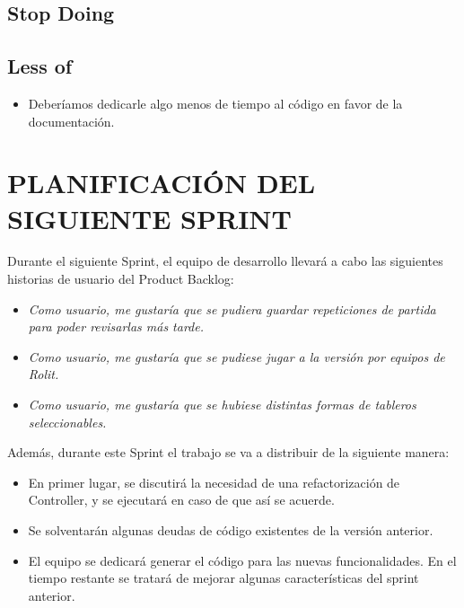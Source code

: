 \documentclass{article}
\begin{document}
\subsection{Stop Doing}


\subsection{Less of}
\begin{itemize}
\item Deberíamos dedicarle algo menos de tiempo al código en favor de la documentación.
\end{itemize}

\section{PLANIFICACIÓN DEL SIGUIENTE SPRINT}
Durante el siguiente Sprint, el equipo de desarrollo llevará a cabo las siguientes historias de usuario del Product Backlog:
\begin{itemize}
\item \textit{Como usuario, me gustaría que se pudiera guardar repeticiones de partida para poder revisarlas más tarde.}
\item \textit{Como usuario, me gustaría que se pudiese jugar a la versión por equipos de Rolit.}
\item \textit{Como usuario, me gustaría que se hubiese distintas formas de tableros seleccionables.}
\end{itemize}
Además, durante este Sprint el trabajo se va a distribuir de la siguiente manera:
\begin{itemize}
\item En primer lugar, se discutirá la necesidad de una refactorización de Controller, y se ejecutará en caso de que así se acuerde.
\item Se solventarán algunas deudas de código existentes de la versión anterior.
\item El equipo se dedicará generar el código para las nuevas funcionalidades. En el tiempo restante se tratará de mejorar algunas características del sprint anterior.
\end{itemize}
\end{document}
